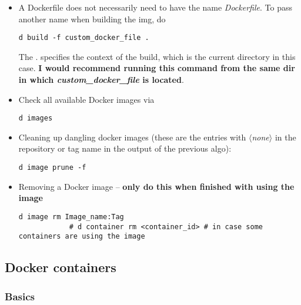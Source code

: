 \documentclass[12pt, a4paper]{article}
\numberwithin{equation}{section}
\theoremstyle{definition}
\theoremstyle{definition}
\begin{document}
	\begin{itemize}
		
		\item A Dockerfile does not necessarily need to have the name \textit{Dockerfile}. To pass another name when building the img, do 
		
		\begin{lstlisting}[style=mystylebash, label=alg:docker__build_with_custom_img_name, xleftmargin=\parindent]
			d build -f custom_docker_file .
		\end{lstlisting}
		
		The . specifies the context of the build, which is the current directory in this case. \textbf{I would recommend running this command from the same dir in which \textit{custom\_docker\_file} is located}.
		
		\item Check all available Docker images via
		
		\begin{lstlisting}[style=mystylebash, label=alg:docker__check_avail_imgs, xleftmargin=\parindent]
			d images
		\end{lstlisting}
		
		\item Cleaning up dangling docker images (these are the entries with \textit{$\langle$none$\rangle$} in the repository or tag name in the output of the previous algo):
		
		\begin{lstlisting}[style=mystylebash, label=alg:docker_rm__dangling, xleftmargin=\parindent]
			d image prune -f
		\end{lstlisting}
		
		\item Removing a Docker image -- \textbf{only do this when finished with using the image}
		
		\begin{lstlisting}[style=mystylebash, label=alg:docker_remove, xleftmargin=\parindent]
			d image rm Image_name:Tag
			# d container rm <container_id> # in case some containers are using the image
		\end{lstlisting}
		
	\end{itemize}
	
	\subsection{Docker containers}
	
		\subsubsection{Basics}
\end{document}
